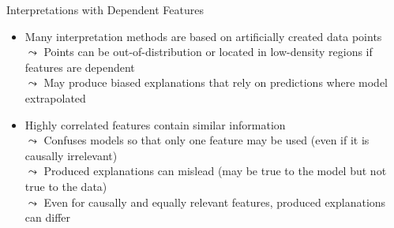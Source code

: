 \documentclass[11pt,compress,t,notes=noshow, aspectratio=169, xcolor=table]{beamer}
\begin{document}
\begin{frame}{Interpretations with Dependent Features}
\begin{itemize}
\item Many interpretation methods are based on 
artificially created data points \\
$\leadsto$ Points can be out-of-distribution or located in low-density regions if features are dependent\\
$\leadsto$ May produce biased explanations that rely on predictions where model extrapolated\\
\pause
\item Highly correlated features contain similar information \\
$\leadsto$ Confuses models so that only one feature may be used (even if it is causally irrelevant)
\\
$\leadsto$ Produced explanations can mislead (may be true to the model but not true to the data) %
\\
$\leadsto$ Even for causally and equally relevant features, produced explanations can differ


\end{itemize}
\end{frame}
\end{document}
